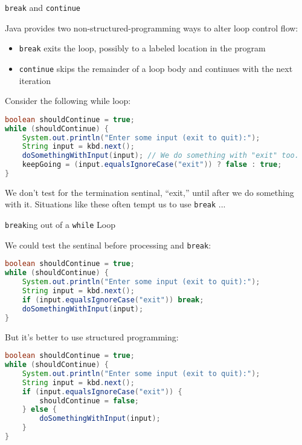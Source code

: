 \documentclass{beamer}
\begin{document}
\begin{frame}[fragile]{{\tt break} and {\tt continue}}


Java provides two non-structured-programming ways to alter loop control flow:
\begin{itemize}
\item {\tt break} exits the loop, possibly to a labeled location in the program
\item {\tt continue} skips the remainder of a loop body and continues with the next iteration
\end{itemize}

Consider the following while loop:
\begin{lstlisting}[language=Java]
boolean shouldContinue = true;
while (shouldContinue) {
    System.out.println("Enter some input (exit to quit):");
    String input = kbd.next();
    doSomethingWithInput(input); // We do something with "exit" too.
    keepGoing = (input.equalsIgnoreCase("exit")) ? false : true;
}
\end{lstlisting}
We don't test for the termination sentinal, ``exit,'' until after we do something with it.  Situations like these often tempt us to use {\tt break} ...

\end{frame}

\begin{frame}[fragile]{{\tt break}ing out of a {\tt while} Loop}


We could test the sentinal before processing and {\tt break}:
\vspace{-.05in}
\begin{lstlisting}[language=Java]
boolean shouldContinue = true;
while (shouldContinue) {
    System.out.println("Enter some input (exit to quit):");
    String input = kbd.next();
    if (input.equalsIgnoreCase("exit")) break;
    doSomethingWithInput(input);
}
\end{lstlisting}
\vspace{-.1in}
But it's better to use structured programming:
\vspace{-.05in}
\begin{lstlisting}[language=Java]
boolean shouldContinue = true;
while (shouldContinue) {
    System.out.println("Enter some input (exit to quit):");
    String input = kbd.next();
    if (input.equalsIgnoreCase("exit")) {
        shouldContinue = false;
    } else {
        doSomethingWithInput(input);
    }
}
\end{lstlisting}


\end{frame}








\end{document}
